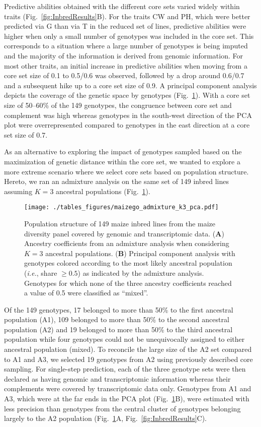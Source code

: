 \documentclass[12pt,titlepage]{article}
\begin{document}
Predictive abilities obtained with the different core sets varied widely within
traits (Fig.~\ref{fig:InbredResults}B).
For the traits CW and PH, which were better predicted via G than via T in the 
reduced set of lines, predictive abilities were higher when only a small number 
of genotypes was included in the core set.
This corresponds to a situation where a large number of genotypes is being 
imputed and the majority of the information is derived from genomic information. 
For most other traits, an initial increase in predictive abilities when moving
from a core set size of 0.1 to 0.5/0.6 was observed, followed by a drop around
0.6/0.7 and a subsequent hike up to a core set size of 0.9.
A principal component analysis depicts the coverage of the genetic space by
genotypes (Fig.~\ref{fig:PopStructure}).
With a core set size of 50--60\% of the 149 genotypes, the congruence between
core set and complement was high whereas genotypes in the south-west direction
of the PCA plot were overrepresented compared to genotypes in the east 
direction at a core set size of 0.7.

As an alternative to exploring the impact of genotypes sampled based on the
maximization of genetic distance within the core set, we wanted to explore a
more extreme scenario where we select core sets based on population structure.
Hereto, we ran an admixture analysis on the same set of 149 inbred lines 
assuming $K=3$ ancestral populations (Fig.~\ref{fig:PopStructure}).

\begin{figure}[H]
\centering
\texttt{[image: ./tables\_figures/maizego\_admixture\_k3\_pca.pdf]}
\caption{
  Population structure of 149 maize inbred lines from the maize diversity panel
  covered by genomic and transcriptomic data.
  (\textbf{A}) Ancestry coefficients from an admixture analysis when 
  considering $K=3$ ancestral populations.
  (\textbf{B}) Principal component analysis with genotypes colored according to 
  the most likely ancestral population (\textit{i.e.}, share $\geq 0.5$) as 
  indicated by the admixture analysis.
  Genotypes for which none of the three ancestry coefficients reached a value
  of 0.5 were classified as ``mixed''.
}
\label{fig:PopStructure}
\end{figure}


Of the 149 genotypes, 17 belonged to more than 50\% to the first ancestral
population (A1), 109 belonged to more than 50\% to the second ancestral
population (A2) and 19 belonged to more than 50\% to the third ancestral
population while four genotypes could not be unequivocally assigned to either
ancestral population (mixed).
To reconcile the large size of the A2 set compared to A1 and A3, we selected 19 
genotypes from A2 using previously described core sampling.
For single-step prediction, each of the three genotype sets were then declared
as having genomic and transcriptomic information whereas their complements were
covered by transcriptomic data only.
Genotypes from A1 and A3, which were at the far ends in the PCA plot 
(Fig.~\ref{fig:PopStructure}B), were estimated with less precision than genotypes
from the central cluster of genotypes belonging largely to the A2 population
(Fig.~\ref{fig:PopStructure}A, Fig.~\ref{fig:InbredResults}C).
\end{document}
